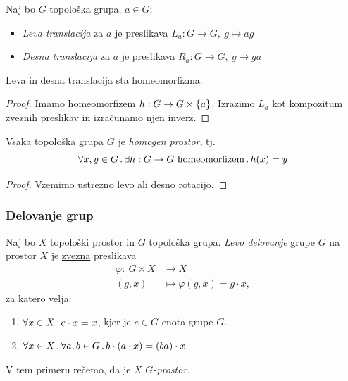 \begin{definicija}
    Naj bo \(G\) topološka grupa, \(a \in G\):
    \begin{itemize}
        \item \emph{Leva translacija} za \(a\) je preslikava \(L_a: G \to G, \ g \mapsto ag\)
        \item \emph{Desna translacija} za \(a\) je preslikava \(R_a: G \to G, \ g \mapsto ga\)
    \end{itemize}
\end{definicija}

\begin{trditev}
    Leva in desna translacija sta homeomorfizma.
\end{trditev}

\begin{proof}
    Imamo homeomorfizem \(h: G \to G \times \left\{a\right\}\). Izrazimo \(L_a\) kot kompozitum zveznih preslikav in izračunamo njen inverz.
\end{proof}

\begin{posledica}
    Vsaka topološka grupa \(G\) je \emph{homogen prostor}, tj.
    \[\forall x, y \in G \,.\, \exists h: G \to G \ \text{homeomorfizem} \,.\, h(x) = y\]
\end{posledica}

\begin{proof}
    Vzemimo ustrezno levo ali desno rotacijo.
\end{proof}

\subsubsection*{Delovanje grup}
\begin{definicija}
    Naj bo \(X\) topološki prostor in \(G\) topološka grupa. \emph{Levo delovanje} grupe \(G\) na prostor \(X\) je \underline{zvezna} preslikava
    \begin{align*}
        \varphi: \ G \times X &\longrightarrow X \\
        (g, x) &\longmapsto \varphi(g,x) = g \cdot x,
    \end{align*}
    za katero velja:
    \begin{enumerate}
        \item \(\forall x \in X \,.\, e \cdot x = x\), kjer je \(e \in G\) enota grupe \(G\).
        \item \(\forall x \in X \,.\, \forall a, b \in G \,.\, b\cdot(a \cdot x) = (ba) \cdot x\)
    \end{enumerate}
    V tem primeru rečemo, da je \(X\) \emph{\(G\)-prostor.}
\end{definicija}

